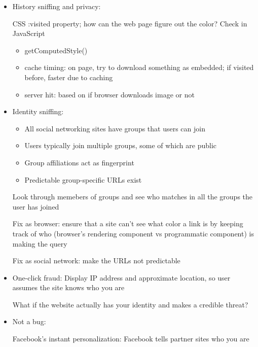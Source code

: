 \begin{itemize}
    \item History sniffing and privacy:

        CSS :visited property; how can the web page figure out the color? Check
        in JavaScript
        \begin{itemize}
            \item getComputedStyle()
            \item cache timing: on page, try to download something as embedded;
                if visited before, faster due to caching
            \item server hit: based on if browser downloads image or not
        \end{itemize}
    \item Identity sniffing:
        \begin{itemize}
            \item All social networking sites have groups that users can join
            \item Users typically join multiple groups, some of which are public
            \item Group affiliations act as fingerprint
            \item Predictable group-specific URLs exist
        \end{itemize}
        Look through memebers of groups and see who matches in all the groups
        the user has joined

        Fix as browser: ensure that a site can't see what color a link is by
        keeping track of who (browser's rendering component vs programmatic
        component) is making the query

        Fix as social network: make the URLs not predictable
    \item One-click fraud: Display IP address and approximate location, so user
        assumes the site knows who you are

        What if the website actually has your identity and makes a credible
        threat?
    \item Not a bug:

        Facebook's instant personalization: Facebook tells partner sites who you
        are
\end{itemize}

